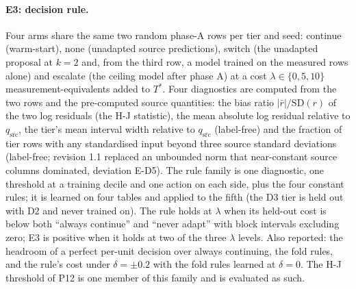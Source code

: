 \documentclass[11pt,a4paper]{article}
\begin{document}
\paragraph{E3: decision rule.} Four arms share the same two random phase-A rows per tier and seed:
continue (warm-start), none (unadapted source predictions), switch (the unadapted proposal at $k = 2$
and, from the third row, a model trained on the measured rows alone) and escalate (the ceiling model
after phase A) at a cost $\lambda \in \{0, 5, 10\}$ measurement-equivalents added to
$T^{*}$. Four diagnostics are computed from the two rows and the pre-computed source quantities: the
bias ratio $|\bar r| / \mathrm{SD}(r)$ of the two log residuals (the H-J statistic), the mean absolute
log residual relative to $q_{\mathrm{src}}$, the tier's mean interval width relative to $q_{\mathrm{src}}$
(label-free) and the fraction of tier rows with any standardised input beyond three source standard
deviations (label-free; revision 1.1 replaced an unbounded norm that near-constant source columns
dominated, deviation E-D5). The rule family is one diagnostic, one threshold at a training decile and
one action on each side, plus the four constant rules; it is learned on four tables and applied to
the fifth (the D3 tier is held out with D2 and never trained on). The rule holds at $\lambda$ when its
held-out cost is below both ``always continue'' and ``never adapt'' with block intervals excluding
zero; E3 is positive when it holds at two of the three $\lambda$ levels. Also reported: the headroom
of a perfect per-unit decision over always continuing, the fold rules, and the rule's cost under
$\delta = \pm 0.2$ with the fold rules learned at $\delta = 0$. The H-J threshold of P12 is one member
of this family and is evaluated as such.
\end{document}
